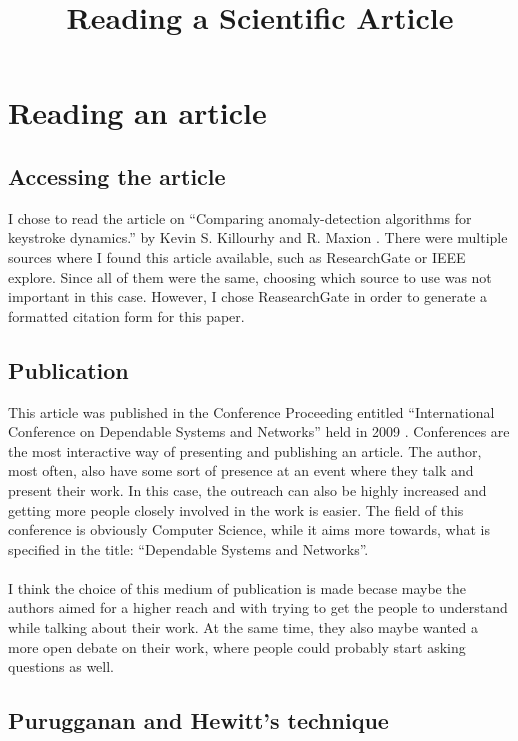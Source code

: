 \documentclass[english]{report}
\begin{document}
\title{Reading a Scientific Article}

\maketitle

\clearpage
\chapter{Reading an article}
\section{Accessing the article}

I chose to read the article on ``Comparing anomaly-detection algorithms for keystroke dynamics.'' by Kevin S. Killourhy and R. Maxion \cite{anomaly}. There were multiple sources where I found this article available, such as ResearchGate or IEEE explore. Since all of them were the same, choosing which source to use was not important in this case. However, I chose ReasearchGate in order to generate a formatted citation form for this paper.

\section{Publication}

This article was published in the Conference Proceeding entitled ``International Conference on Dependable Systems and Networks'' held in 2009 \cite{conference}. Conferences are the most interactive way of presenting and publishing an article. The author, most often, also have some sort of presence at an event where they talk and present their work. In this case, the outreach can also be highly increased and getting more people closely involved in the work is easier. The field of this conference is obviously Computer Science, while it aims more towards, what is specified in the title: ``Dependable Systems and Networks''.
\\\\
I think the choice of this medium of publication is made becase maybe the authors aimed for a higher reach and with trying to get the people to understand while talking about their work. At the same time, they also maybe wanted a more open debate on their work, where people could probably start asking questions as well.

\section{Purugganan and Hewitt's technique}
\end{document}
